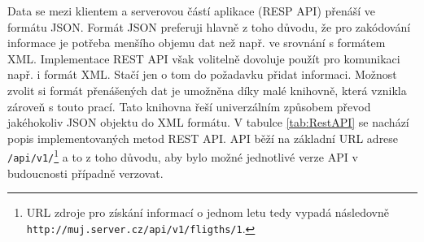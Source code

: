 \documentclass[ing,male,java,dept460]{diploma}						%
\begin{document}
Data se mezi klientem a serverovou částí aplikace (RESP API) přenáší ve formátu JSON. Formát JSON preferuji hlavně z toho důvodu, že pro zakódování informace je potřeba menšího objemu dat než např. ve srovnání s formátem XML. Implementace REST API však volitelně dovoluje použít pro komunikaci např. i formát XML. Stačí jen o tom do požadavku přidat informaci. Možnost zvolit si formát přenášených dat je umožněna díky malé knihovně, která vznikla zároveň s touto prací. Tato knihovna řeší univerzálním způsobem převod jakéhokoliv JSON objektu do XML formátu. V tabulce \ref{tab:RestAPI} se nachází popis implementovaných metod REST API. API běží na základní URL adrese \texttt{/api/v1/}\footnote{URL zdroje pro získání informací o jednom letu tedy vypadá následovně \texttt{http://muj.server.cz/api/v1/fligths/1}.} a to z toho důvodu, aby bylo možné jednotlivé verze API v budoucnosti případně verzovat.
\end{document}
